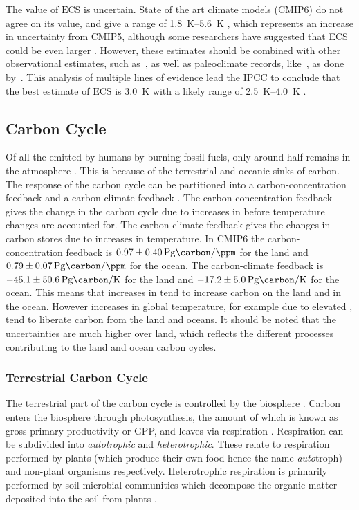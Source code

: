 The value of $\mathrm{ECS}$ is uncertain. State of the art climate models (CMIP6) do not agree on its value, and give a range of
\SIrange{1.8}{5.6}{\kelvin} \parencite{Zelinka2020}, which represents an increase in uncertainty from CMIP5, although some researchers have suggested that ECS could be even
larger \parencite{Stainforth2005}.
However, these estimates should be combined with other observational estimates, such as~\cite{Cox2018}, as well as paleoclimate records, like~\cite{Hargreaves2012}, as done by~\cite{Sherwood2020}.
This analysis of multiple lines of evidence lead the IPCC to conclude that the best estimate of $\mathrm{ECS}$ is \SI{3.0}{\kelvin} with a likely range of \SIrange{2.5}{4.0}{\kelvin} \parencite{AR6}.

\subsection{Carbon Cycle}
Of all the  emitted by humans by burning fossil fuels, only around half remains in the atmosphere \parencite{Friedlingstein2022}. This is because of the terrestrial and oceanic sinks of carbon.
The response of the carbon cycle can be partitioned into a carbon-concentration feedback and a carbon-climate feedback \parencite{Friedlingstein2006}. The carbon-concentration feedback
gives the change in the carbon cycle due to increases in  before temperature changes are accounted for. The carbon-climate feedback gives the changes in carbon stores due to increases
in temperature. In CMIP6 \parencite{Arora2020} the carbon-concentration feedback is $\SI{0.97\pm0.40}{\peta\gram\carbon\per\ppm}$ for the land and $\SI{0.79\pm 0.07}{\peta\gram\carbon\per\ppm}$
for the ocean.
The carbon-climate feedback is $\SI{-45.1\pm50.6}{\peta\gram\carbon\per\kelvin}$ for the land and $\SI{-17.2\pm5.0}{\peta\gram\carbon\per\kelvin}$ for the ocean.
This means that increases in  tend to
increase carbon on the land and in the ocean. However increases in global temperature, for example due to elevated , tend to liberate carbon from the land and oceans. It should be noted
that the uncertainties are much higher over land, which reflects the different processes contributing to the land and ocean carbon cycles.

\subsubsection{Terrestrial Carbon Cycle}
The terrestrial part of the carbon cycle is controlled by the biosphere \parencite{AR6}. Carbon enters the biosphere through photosynthesis, the amount of which is known as gross
primary productivity or GPP, and leaves via respiration \parencite{Jenkinson1991}. Respiration can be subdivided into \emph{autotrophic} and \emph{heterotrophic}.
These relate to respiration performed by plants (which produce their own food hence the name \emph{auto}troph) and non-plant organisms respectively. Heterotrophic respiration
is primarily performed by soil microbial communities which decompose the organic matter deposited into the soil from plants \parencite{Singh1977}.

